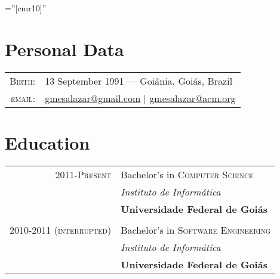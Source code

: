 \documentclass[a4paper,10pt]{article}
\begin{document}
\pagestyle{empty}

\font\fb=''[cmr10]''

\par{\bigskip\par}


\section{Personal Data}

\begin{tabular}{r p{3.5in}}
  \textsc{Birth:} & 13 September 1991 \hspace{0.5em}---\hspace{0.5em} Goiânia, Goiás, Brazil\\
  \textsc{email:}     & \href{mailto:gmesalazar@gmail.com}{gmesalazar@gmail.com} | \href{mailto:gmesalazar@acm.org}{gmesalazar@acm.org}\\
\end{tabular}

\section{Education}
\begin{tabular}{r p{12cm}}
  \textsc{2011-Present} & Bachelor's in \textsc{Computer Science}\\ &
  \emph{Instituto de Informática}\\ &
  \textbf{Universidade Federal de Goiás}
  \\&\\
  \textsc{2010-2011 (interrupted)} & Bachelor's in \textsc{Software Engineering}\\ &
  \emph{Instituto de Informática}\\ &
  \textbf{Universidade Federal de Goiás}
\end{tabular}
\end{document}
